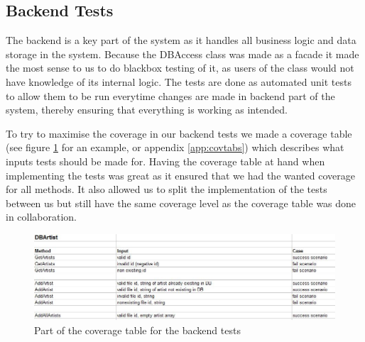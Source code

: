 \subsection{Backend Tests}
The backend is a key part of the system as it handles all business logic and data storage in the system. Because 
the DBAccess class was made as a facade it made the most sense to us to do blackbox testing of it, as users of
the class would not have knowledge of its internal logic. The tests are done as automated unit tests to allow them
to be run everytime changes are made in backend part of the system, thereby ensuring that everything is working as
intended.

To try to maximise the coverage in our backend tests we made a coverage table (see figure \ref{fig:covtabs} for an example,
or appendix \ref{app:covtabs}) which describes what inputs tests should be made for. Having the coverage table at hand
when implementing the tests was great as it ensured that we had the wanted coverage for all methods. It also allowed us
 to split the implementation of the tests between us but still have the same coverage level as the coverage table was done
 in collaboration.

\begin{figure}[hbt]
	\centering
	\includegraphics[scale=0.5]{./testing/coverage.jpg}
	\caption{Part of the coverage table for the backend tests}
	\label{fig:covtabs}
\end{figure}
  